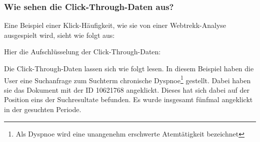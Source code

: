 \subsubsection{Wie sehen die Click-Through-Daten aus?}
\label{sec:Grundlagen:Grundbegriffe:Click-Through-Daten:AussehenClick-Through-Daten}

Eine Beispiel einer Klick-Häufigkeit, wie sie von einer Webtrekk-Analyse ausgespielt wird, sieht wie folgt aus:

\begin{table}[H]
\centering
\vspace{-.75em}
\caption[Beispiel Click-Through-Daten]{Beispiel Click-Through-Daten}
\vspace{-.5em}
\label{tab:BeispielCTDaten}
\footnotesize
\renewcommand*{\arraystretch}{1.2}
\vspace{-2em}
\end{table}

Hier die Aufschlüsselung der Click-Through-Daten:

\begin{table}[H]
\centering
\vspace{-.75em}
\caption[Beispielhafte Aufschlüsselung der Click-Through-Daten]{Beispielhafte Aufschlüsselung der Click-Through-Daten}
\label{tab:AufschluesselungCTDaten}
\vspace{-.5em}
\footnotesize
\renewcommand*{\arraystretch}{1.2}
\vspace{-2em}
\end{table}

Die Click-Through-Daten lassen sich wie folgt lesen. In diesem Beispiel haben die User eine Suchanfrage zum Suchterm \glqq chronische Dyspnoe\grqq{}\footnote{Als Dyspnoe wird eine unangenehm erschwerte Atemtätigkeit bezeichnet} gestellt. Dabei haben sie das Dokument mit der ID 10621768 angeklickt. Dieses hat sich dabei auf der Position eins der Suchresultate befunden. Es wurde insgesamt fünfmal angeklickt in der gesuchten Periode. 

